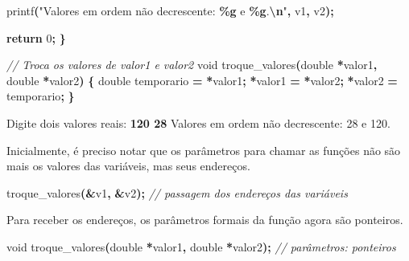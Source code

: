 \documentclass[
  11pt,
  a4paper,
]{scrbook}
\newenvironment{Shaded}{\begin{snugshade}}{\end{snugshade}}
\newcommand{\CommentTok}[1]{\textcolor[rgb]{0.56,0.35,0.01}{\textit{#1}}}
\newcommand{\ControlFlowTok}[1]{\textcolor[rgb]{0.13,0.29,0.53}{\textbf{#1}}}
\newcommand{\DataTypeTok}[1]{\textcolor[rgb]{0.13,0.29,0.53}{#1}}
\newcommand{\DecValTok}[1]{\textcolor[rgb]{0.00,0.00,0.81}{#1}}
\newcommand{\KeywordTok}[1]{\textcolor[rgb]{0.13,0.29,0.53}{\textbf{#1}}}
\newcommand{\NormalTok}[1]{#1}
\newcommand{\OperatorTok}[1]{\textcolor[rgb]{0.81,0.36,0.00}{\textbf{#1}}}
\newcommand{\SpecialCharTok}[1]{\textcolor[rgb]{0.81,0.36,0.00}{\textbf{#1}}}
\newcommand{\StringTok}[1]{\textcolor[rgb]{0.31,0.60,0.02}{#1}}
\begin{document}
\begin{Shaded}
\begin{Highlighting}[]
\NormalTok{    printf}\OperatorTok{(}\StringTok{"Valores em ordem não decrescente: }\SpecialCharTok{\%g}\StringTok{ e }\SpecialCharTok{\%g}\StringTok{.}\SpecialCharTok{\textbackslash{}n}\StringTok{"}\OperatorTok{,}\NormalTok{ v1}\OperatorTok{,}\NormalTok{ v2}\OperatorTok{);}

    \ControlFlowTok{return} \DecValTok{0}\OperatorTok{;}
\OperatorTok{\}}

\CommentTok{// Troca os valores de valor1 e valor2}
\DataTypeTok{void}\NormalTok{ troque\_valores}\OperatorTok{(}\DataTypeTok{double} \OperatorTok{*}\NormalTok{valor1}\OperatorTok{,} \DataTypeTok{double} \OperatorTok{*}\NormalTok{valor2}\OperatorTok{)} \OperatorTok{\{}
    \DataTypeTok{double}\NormalTok{ temporario }\OperatorTok{=} \OperatorTok{*}\NormalTok{valor1}\OperatorTok{;}
    \OperatorTok{*}\NormalTok{valor1 }\OperatorTok{=} \OperatorTok{*}\NormalTok{valor2}\OperatorTok{;}
    \OperatorTok{*}\NormalTok{valor2 }\OperatorTok{=}\NormalTok{ temporario}\OperatorTok{;}
\OperatorTok{\}}
\end{Highlighting}
\end{Shaded}

\begin{Shaded}
\begin{Highlighting}[]
\NormalTok{Digite dois valores reais: }\KeywordTok{ 120 28 }
\NormalTok{Valores em ordem não decrescente: 28 e 120.}
\end{Highlighting}
\end{Shaded}

Inicialmente, é preciso notar que os parâmetros para chamar as funções
não são mais os valores das variáveis, mas seus endereços.

\begin{Shaded}
\begin{Highlighting}[]
\NormalTok{troque\_valores}\OperatorTok{(\&}\NormalTok{v1}\OperatorTok{,} \OperatorTok{\&}\NormalTok{v2}\OperatorTok{);}  \CommentTok{// passagem dos endereços das variáveis}
\end{Highlighting}
\end{Shaded}

Para receber os endereços, os parâmetros formais da função agora são
ponteiros.

\begin{Shaded}
\begin{Highlighting}[]
\DataTypeTok{void}\NormalTok{ troque\_valores}\OperatorTok{(}\DataTypeTok{double} \OperatorTok{*}\NormalTok{valor1}\OperatorTok{,} \DataTypeTok{double} \OperatorTok{*}\NormalTok{valor2}\OperatorTok{);}  \CommentTok{// parâmetros: ponteiros}
\end{Highlighting}
\end{Shaded}
\end{document}
